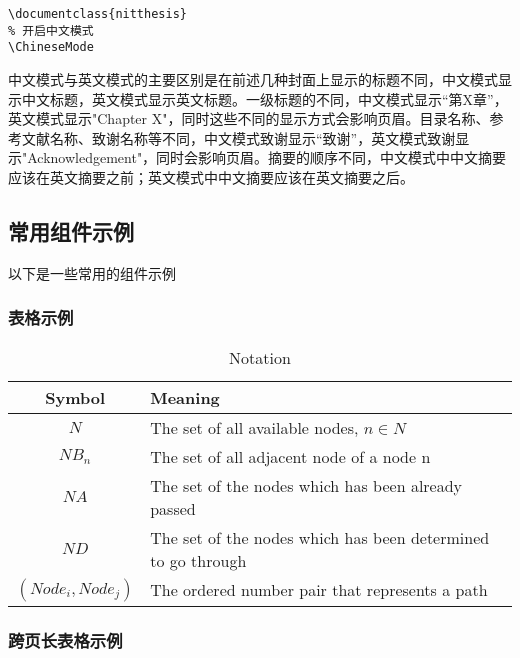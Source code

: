 \documentclass{nitthesis}
\begin{document}
\begin{lstlisting}
\documentclass{nitthesis}
% 开启中文模式
\ChineseMode
\end{lstlisting}

中文模式与英文模式的主要区别是在前述几种封面上显示的标题不同，中文模式显示中文标题，英文模式显示英文标题。一级标题的不同，中文模式显示“第X章”，英文模式显示"Chapter X"，同时这些不同的显示方式会影响页眉。目录名称、参考文献名称、致谢名称等不同，中文模式致谢显示“致谢”，英文模式致谢显示"Acknowledgement"，同时会影响页眉。摘要的顺序不同，中文模式中中文摘要应该在英文摘要之前；英文模式中中文摘要应该在英文摘要之后。

\subsection{常用组件示例}

以下是一些常用的组件示例

\subsubsection{表格示例}

\begin{table}[H]
    \centering
    \caption{Notation}
    \label{table.example}
    \begin{tabular}{cp{12cm}}
        \toprule
        \centering
        \textbf{Symbol}    & \textbf{Meaning}                                                                             \\
        \midrule
        $N$                & The set of all available nodes, $n \in N$                                                    \\
        $NB_n$             & The set of all adjacent node of a node n                                                     \\
        $NA$               & The set of the nodes which has been already passed                                           \\
        $ND$               & The set of the nodes which has been determined to go through                                 \\
        $(Node_i, Node_j)$ & The ordered number pair that represents a path                                               \\
        \bottomrule
    \end{tabular}
\end{table}

\subsubsection{跨页长表格示例}
\end{document}
